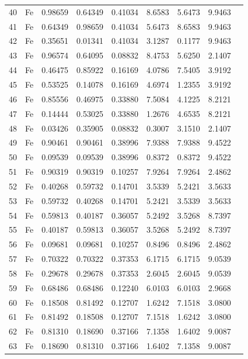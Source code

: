 \begin{longtable}{rlrrrrrrl}
40 & Fe & 0.98659 & 0.64349 & 0.41034 & 8.6583 & 5.6473 & 9.9463 &  \\
41 & Fe & 0.64349 & 0.98659 & 0.41034 & 5.6473 & 8.6583 & 9.9463 &  \\
42 & Fe & 0.35651 & 0.01341 & 0.41034 & 3.1287 & 0.1177 & 9.9463 &  \\
43 & Fe & 0.96574 & 0.64095 & 0.08832 & 8.4753 & 5.6250 & 2.1407 &  \\
44 & Fe & 0.46475 & 0.85922 & 0.16169 & 4.0786 & 7.5405 & 3.9192 &  \\
45 & Fe & 0.53525 & 0.14078 & 0.16169 & 4.6974 & 1.2355 & 3.9192 &  \\
46 & Fe & 0.85556 & 0.46975 & 0.33880 & 7.5084 & 4.1225 & 8.2121 &  \\
47 & Fe & 0.14444 & 0.53025 & 0.33880 & 1.2676 & 4.6535 & 8.2121 &  \\
48 & Fe & 0.03426 & 0.35905 & 0.08832 & 0.3007 & 3.1510 & 2.1407 &  \\
49 & Fe & 0.90461 & 0.90461 & 0.38996 & 7.9388 & 7.9388 & 9.4522 &  \\
50 & Fe & 0.09539 & 0.09539 & 0.38996 & 0.8372 & 0.8372 & 9.4522 &  \\
51 & Fe & 0.90319 & 0.90319 & 0.10257 & 7.9264 & 7.9264 & 2.4862 &  \\
52 & Fe & 0.40268 & 0.59732 & 0.14701 & 3.5339 & 5.2421 & 3.5633 &  \\
53 & Fe & 0.59732 & 0.40268 & 0.14701 & 5.2421 & 3.5339 & 3.5633 &  \\
54 & Fe & 0.59813 & 0.40187 & 0.36057 & 5.2492 & 3.5268 & 8.7397 &  \\
55 & Fe & 0.40187 & 0.59813 & 0.36057 & 3.5268 & 5.2492 & 8.7397 &  \\
56 & Fe & 0.09681 & 0.09681 & 0.10257 & 0.8496 & 0.8496 & 2.4862 &  \\
57 & Fe & 0.70322 & 0.70322 & 0.37353 & 6.1715 & 6.1715 & 9.0539 &  \\
58 & Fe & 0.29678 & 0.29678 & 0.37353 & 2.6045 & 2.6045 & 9.0539 &  \\
59 & Fe & 0.68486 & 0.68486 & 0.12240 & 6.0103 & 6.0103 & 2.9668 &  \\
60 & Fe & 0.18508 & 0.81492 & 0.12707 & 1.6242 & 7.1518 & 3.0800 &  \\
61 & Fe & 0.81492 & 0.18508 & 0.12707 & 7.1518 & 1.6242 & 3.0800 &  \\
62 & Fe & 0.81310 & 0.18690 & 0.37166 & 7.1358 & 1.6402 & 9.0087 &  \\
63 & Fe & 0.18690 & 0.81310 & 0.37166 & 1.6402 & 7.1358 & 9.0087 &  \\

\end{longtable}
